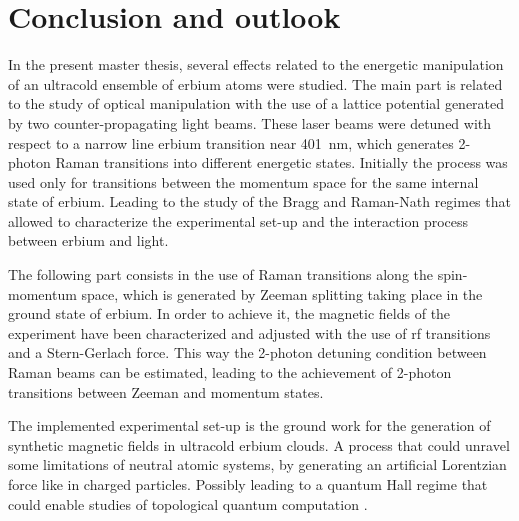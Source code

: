 
\chapter{Conclusion and outlook}
\label{chap:outlook}

In the present master thesis, several effects related to the energetic manipulation of an ultracold ensemble of erbium atoms were studied. The main part is related to the study of optical manipulation with the use of a lattice potential generated by two counter-propagating light beams. These laser beams were detuned with respect to a narrow line erbium transition near \SI{401}{\nano\meter}, which generates 2-photon Raman transitions into different energetic states. Initially the process was used only for transitions between the momentum space for the same internal state of erbium. Leading to the study of the Bragg and Raman-Nath regimes that allowed to characterize the experimental set-up and the interaction process between erbium and light.

The following part consists in the use of Raman transitions along the spin-momentum space, which is generated by Zeeman splitting taking place in the ground state of erbium. In order to achieve it, the magnetic fields of the experiment have been characterized and adjusted with the use of \acl{rf} transitions and a Stern-Gerlach force. This way the 2-photon detuning condition between Raman beams can be estimated, leading to the achievement of 2-photon transitions between Zeeman and momentum states.

The implemented experimental set-up is the ground work for the generation of synthetic magnetic fields in ultracold erbium clouds. A process that could unravel some limitations of neutral atomic systems, by generating an artificial Lorentzian force like in charged particles. Possibly leading to a quantum Hall regime that could enable studies of topological quantum computation \cite{Lin2009}.



